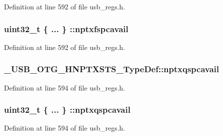 Definition at line 592 of file usb\-\_\-regs.\-h.

\hypertarget{group___u_s_b___o_t_g___d_r_i_v_e_r_gac857940e614f393322b7f87643682eeb}{
\subsubsection[{nptxfspcavail}]{\setlength{\rightskip}{0pt plus 5cm}uint32\-\_\-t \{ ... \} \-::nptxfspcavail}}\label{group___u_s_b___o_t_g___d_r_i_v_e_r_gac857940e614f393322b7f87643682eeb}


Definition at line 592 of file usb\-\_\-regs.\-h.

\hypertarget{group___u_s_b___o_t_g___d_r_i_v_e_r_gac7c8e3ec8eb043384cd26aaf67009f46}{
\subsubsection[{nptxqspcavail}]{ \-\_\-\-U\-S\-B\-\_\-\-O\-T\-G\-\_\-\-H\-N\-P\-T\-X\-S\-T\-S\-\_\-\-Type\-Def\-::nptxqspcavail}}\label{group___u_s_b___o_t_g___d_r_i_v_e_r_gac7c8e3ec8eb043384cd26aaf67009f46}


Definition at line 594 of file usb\-\_\-regs.\-h.

\hypertarget{group___u_s_b___o_t_g___d_r_i_v_e_r_gaa025dbe87dad32e262876327e2b9fab1}{
\subsubsection[{nptxqspcavail}]{\setlength{\rightskip}{0pt plus 5cm}uint32\-\_\-t \{ ... \} \-::nptxqspcavail}}\label{group___u_s_b___o_t_g___d_r_i_v_e_r_gaa025dbe87dad32e262876327e2b9fab1}


Definition at line 594 of file usb\-\_\-regs.\-h.

